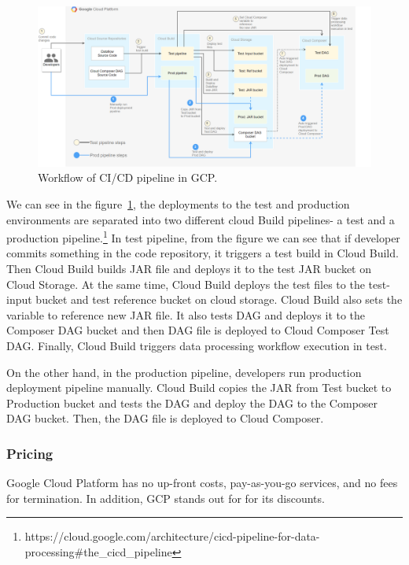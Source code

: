 
\begin{figure}[h]
    \centering
    \includegraphics[scale=0.53]{images/shoaib/cicd-pipeline-for-data-processing-1-diagram-pipeline.png}
    \caption{Workflow of CI/CD pipeline in GCP.} 
    \label{fig:gcp_cicd}
\end{figure}
%
We can see in the figure~\ref{fig:gcp_cicd},  the deployments to the test and production environments are separated into two different cloud Build pipelines- a test and a production pipeline.\footnote{https://cloud.google.com/architecture/cicd-pipeline-for-data-processing\#the\_cicd\_pipeline} 
\newline In test pipeline, from the figure we can see that if developer commits something in the code repository, it triggers a test build in Cloud Build. Then Cloud Build builds JAR file and deploys it to the test JAR bucket on Cloud Storage. At the same time, Cloud Build deploys the test files to the test-input bucket and test reference bucket on cloud storage. Cloud Build also sets the variable to reference new JAR file. It also tests DAG and deploys it to the Composer DAG bucket and then DAG file is deployed to Cloud Composer Test DAG. Finally, Cloud Build triggers data processing workflow execution in test. 

On the other hand, in the production pipeline, developers run production deployment pipeline manually. Cloud Build copies the JAR from Test bucket to Production bucket and tests the DAG and deploy the DAG to the Composer DAG bucket. Then, the DAG file is deployed to Cloud Composer. 


%
%
\subsubsection{Pricing}
%
Google Cloud Platform has no up-front costs, pay-as-you-go services, and no fees for termination. In addition, GCP stands out for for its discounts. 
%
